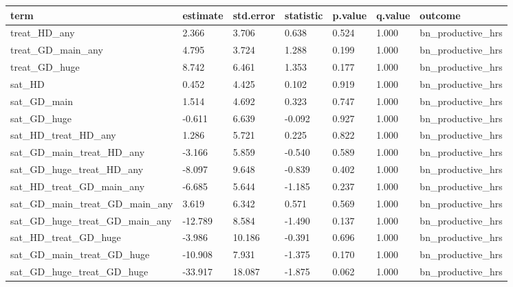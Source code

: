 \begin{tabular}{lllllll}
\toprule
term & estimate & std.error & statistic & p.value & q.value & outcome
 \\
\midrule
treat\_HD\_any & 2.366 & 3.706 & 0.638 & 0.524 & 1.000 & bn\_productive\_hrs \\
treat\_GD\_main\_any & 4.795 & 3.724 & 1.288 & 0.199 & 1.000 & bn\_productive\_hrs \\
treat\_GD\_huge & 8.742 & 6.461 & 1.353 & 0.177 & 1.000 & bn\_productive\_hrs \\
sat\_HD & 0.452 & 4.425 & 0.102 & 0.919 & 1.000 & bn\_productive\_hrs \\
sat\_GD\_main & 1.514 & 4.692 & 0.323 & 0.747 & 1.000 & bn\_productive\_hrs \\
sat\_GD\_huge & -0.611 & 6.639 & -0.092 & 0.927 & 1.000 & bn\_productive\_hrs \\
sat\_HD\_treat\_HD\_any & 1.286 & 5.721 & 0.225 & 0.822 & 1.000 & bn\_productive\_hrs \\
sat\_GD\_main\_treat\_HD\_any & -3.166 & 5.859 & -0.540 & 0.589 & 1.000 & bn\_productive\_hrs \\
sat\_GD\_huge\_treat\_HD\_any & -8.097 & 9.648 & -0.839 & 0.402 & 1.000 & bn\_productive\_hrs \\
sat\_HD\_treat\_GD\_main\_any & -6.685 & 5.644 & -1.185 & 0.237 & 1.000 & bn\_productive\_hrs \\
sat\_GD\_main\_treat\_GD\_main\_any & 3.619 & 6.342 & 0.571 & 0.569 & 1.000 & bn\_productive\_hrs \\
sat\_GD\_huge\_treat\_GD\_main\_any & -12.789 & 8.584 & -1.490 & 0.137 & 1.000 & bn\_productive\_hrs \\
sat\_HD\_treat\_GD\_huge & -3.986 & 10.186 & -0.391 & 0.696 & 1.000 & bn\_productive\_hrs \\
sat\_GD\_main\_treat\_GD\_huge & -10.908 & 7.931 & -1.375 & 0.170 & 1.000 & bn\_productive\_hrs \\
sat\_GD\_huge\_treat\_GD\_huge & -33.917 & 18.087 & -1.875 & 0.062 & 1.000 & bn\_productive\_hrs \\
\bottomrule
\end{tabular}
